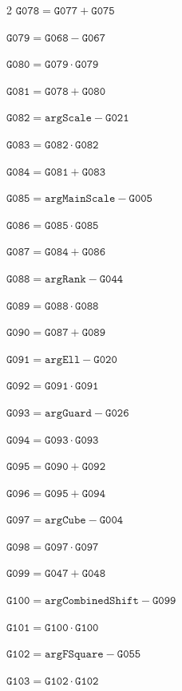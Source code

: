 \documentclass[10pt]{article}
\begin{document}
\begin{multicols}{2}
\noindent $\mathtt{G078}=\mathtt{G077}+\mathtt{G075}$\par
\noindent $\mathtt{G079}=\mathtt{G068}-\mathtt{G067}$\par
\noindent $\mathtt{G080}=\mathtt{G079}\cdot \mathtt{G079}$\par
\noindent $\mathtt{G081}=\mathtt{G078}+\mathtt{G080}$\par
\noindent $\mathtt{G082}=\mathtt{argScale}-\mathtt{G021}$\par
\noindent $\mathtt{G083}=\mathtt{G082}\cdot \mathtt{G082}$\par
\noindent $\mathtt{G084}=\mathtt{G081}+\mathtt{G083}$\par
\noindent $\mathtt{G085}=\mathtt{argMainScale}-\mathtt{G005}$\par
\noindent $\mathtt{G086}=\mathtt{G085}\cdot \mathtt{G085}$\par
\noindent $\mathtt{G087}=\mathtt{G084}+\mathtt{G086}$\par
\noindent $\mathtt{G088}=\mathtt{argRank}-\mathtt{G044}$\par
\noindent $\mathtt{G089}=\mathtt{G088}\cdot \mathtt{G088}$\par
\noindent $\mathtt{G090}=\mathtt{G087}+\mathtt{G089}$\par
\noindent $\mathtt{G091}=\mathtt{argEll}-\mathtt{G020}$\par
\noindent $\mathtt{G092}=\mathtt{G091}\cdot \mathtt{G091}$\par
\noindent $\mathtt{G093}=\mathtt{argGuard}-\mathtt{G026}$\par
\noindent $\mathtt{G094}=\mathtt{G093}\cdot \mathtt{G093}$\par
\noindent $\mathtt{G095}=\mathtt{G090}+\mathtt{G092}$\par
\noindent $\mathtt{G096}=\mathtt{G095}+\mathtt{G094}$\par
\noindent $\mathtt{G097}=\mathtt{argCube}-\mathtt{G004}$\par
\noindent $\mathtt{G098}=\mathtt{G097}\cdot \mathtt{G097}$\par
\noindent $\mathtt{G099}=\mathtt{G047}+\mathtt{G048}$\par
\noindent $\mathtt{G100}=\mathtt{argCombinedShift}-\mathtt{G099}$\par
\noindent $\mathtt{G101}=\mathtt{G100}\cdot \mathtt{G100}$\par
\noindent $\mathtt{G102}=\mathtt{argFSquare}-\mathtt{G055}$\par
\noindent $\mathtt{G103}=\mathtt{G102}\cdot \mathtt{G102}$\par

\end{multicols}
\end{document}
